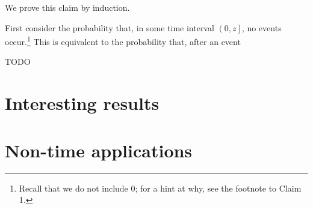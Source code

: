 \documentclass{article}
\begin{document}
We prove this claim by induction. 

First consider the probability that, in some time interval $\left(0, z\right]$, no events occur.\footnote{Recall that we do not include 0; for a hint at why, see the footnote to Claim 1.} This is equivalent to the probability that, after an event 

TODO





\section{Interesting results}


\section{Non-time applications}
\end{document}

